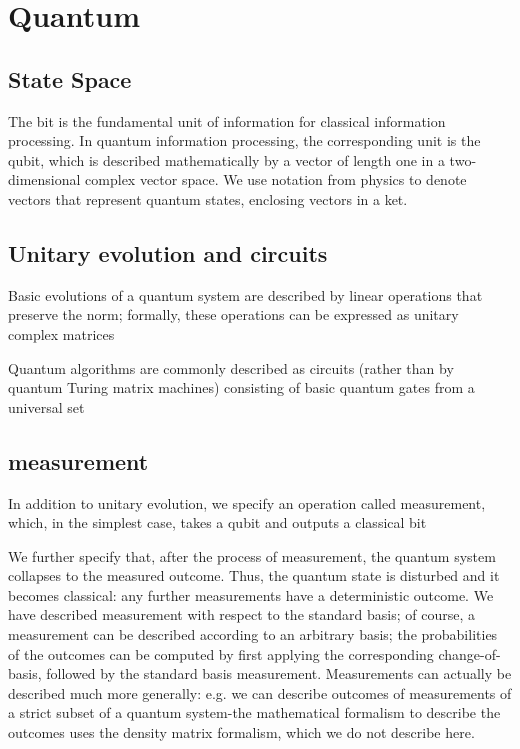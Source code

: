 \chapter{Quantum}
\label{chap:Quantum}

\section{State Space}
The bit is the fundamental unit of information for classical information processing. In quantum information processing, the corresponding unit is the qubit, which is described mathematically by a vector of length one in a two-dimensional complex vector space. We use notation from physics to denote vectors that represent quantum states, enclosing vectors in a ket.

\section{Unitary evolution and circuits}
Basic evolutions of a quantum system are described by linear operations that preserve the norm; formally, these operations can be expressed as unitary complex matrices

Quantum algorithms are commonly described as circuits (rather than by quantum Turing matrix machines) consisting of basic quantum gates from a universal set

\section{measurement}
In addition to unitary evolution, we specify an operation called measurement, which, in the simplest case, takes a qubit and outputs a classical bit

We further specify that, after the process of measurement, the quantum system collapses to the measured outcome. Thus, the quantum state is disturbed and it becomes classical: any further measurements have a deterministic outcome. We have described measurement with respect to the standard basis; of course, a measurement can be described according to an arbitrary basis; the probabilities of the outcomes can be computed by first applying the corresponding change-of-basis, followed by the standard basis measurement. Measurements can actually be described much more generally: e.g. we can describe outcomes of measurements of a strict subset of a quantum system-the mathematical formalism to describe the outcomes uses the density matrix formalism, which we do not describe here.\textcite{Broadbent2016}



